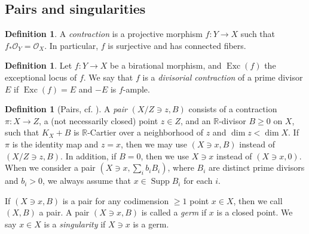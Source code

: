 \documentclass[11pt]{amsart}
\numberwithin{equation}{section}
\newcommand{\Rr}{\mathbb{R}}
\newcommand{\Exc}{\operatorname{Exc}}
\newcommand{\Supp}{\operatorname{Supp}}
\theoremstyle{definition}
\theoremstyle{definition}
\newtheorem{defn}[thm]{Definition}
\begin{document}
\subsection{Pairs and singularities}\label{the definitions of singularities and pairs}



\begin{defn}\label{defn contraction}
A \emph{contraction} is a projective morphism $f: Y\rightarrow X$ such that $f_*\mathcal{O}_Y=\mathcal{O}_X$. In particular, $f$ is surjective and has connected fibers.
\end{defn}

\begin{defn}\label{defn: divisorial contraction}
Let $f: Y\rightarrow X$ be a birational morphism, and $\Exc(f)$ the exceptional locus of $f$. We say that $f$ is a \emph{divisorial contraction} of a prime divisor $E$ if $\Exc(f)=E$ and $-E$ is $f$-ample.
\end{defn}


\begin{defn}[Pairs, {cf. \cite[Definition 3.2]{CH21}}] \label{defn sing}
A \emph{pair} $(X/Z\ni z, B)$ consists of a contraction $\pi: X\rightarrow Z$, a (not necessarily closed) point $z\in Z$, and an $\mathbb{R}$-divisor $B\geq 0$ on $X$, such that $K_X+B$ is $\Rr$-Cartier over a neighborhood of $z$ and $\dim z<\dim X$. If $\pi$ is the identity map and $z=x$, then we may use $(X\ni x, B)$ instead of $(X/Z\ni z,B)$. In addition, if $B=0$, then we use $X\ni x$ instead of $(X\ni x,0)$. When we consider a pair $(X\ni x, \sum_{i} b_iB_i)$, where $B_i$ are distinct prime divisors and $b_i>0$, we always assume that $x\in \Supp B_i$ for each $i$.

If $(X\ni x,B)$ is a pair for any codimension $\geq 1$ point $x\in X$, then we call $(X,B)$ a pair. A pair $(X\ni x, B)$ is called a \emph{germ} if $x$ is a closed point. We say $x\in X$ is a \emph{singularity} if $X\ni x$ is a germ.
\end{defn}
\end{document}
